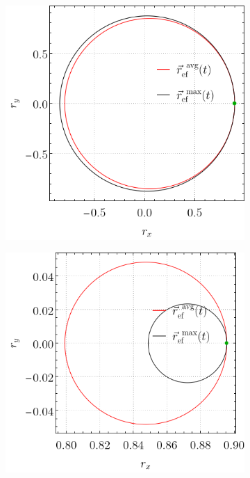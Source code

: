 \begin{figure}[ht!]
    \centering
    \begin{subfigure}{0.5\textwidth}
      \centering
      \includegraphics[width=0.8\linewidth]{appendices/figures/local_AvgVSMax_p2=0.1_r=0.9_w1=0_w2=1.png}
    \end{subfigure}%
    \begin{subfigure}{0.5\textwidth}
      \centering
      \includegraphics[width=0.8\linewidth]{appendices/figures/local_AvgVSMax_p2=0.1_r=0.9_w1=1_w2=0.png}
    \end{subfigure}
    \caption{}\label{ap:EffDunAVGvsMaxEnt1}
\end{figure}

